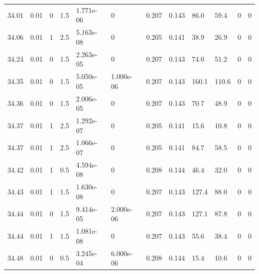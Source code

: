 \documentclass[preview]{standalone}
\begin{document}
{{{{{{{{{{\begin{tabular}{L{1.2cm}C{1.2cm} C{0.3cm}C{0.5cm} C{1.4cm}C{1.4cm} C{1.4cm}C{1.4cm} C{1.6cm}C{1.6cm} C{1.6cm}C{1.6cm}}
  34.01  &  0.01  & 0     & 1.5 &  1.771e-06  & 0  &  0.207&   0.143& 86.0 & 59.4   &  0 & 0  \\ 
  34.06  &  0.01  & 1     & 2.5 &  5.163e-08  & 0  &  0.205&   0.141& 38.9 & 26.9   &  0 & 0  \\ 
  34.24  &  0.01  & 0     & 1.5 &  2.263e-05  & 0  &  0.207&   0.143& 74.0 & 51.2   &  0 & 0  \\ 
  34.35  &  0.01  & 0     & 1.5 &  5.050e-05  & 1.000e-06  &  0.207&   0.143& 160.1 & 110.6   &  0 & 0  \\ 
  34.36  &  0.01  & 0     & 1.5 &  2.006e-05  & 0  &  0.207&   0.143& 70.7 & 48.9   &  0 & 0  \\ 
  34.37  &  0.01  & 1     & 2.5 &  1.292e-07  & 0  &  0.205&   0.141& 15.6 & 10.8   &  0 & 0  \\ 
  34.37  &  0.01  & 1     & 2.5 &  1.066e-07  & 0  &  0.205&   0.141& 84.7 & 58.5   &  0 & 0  \\ 
  34.42  &  0.01  & 1     & 0.5 &  4.594e-08  & 0  &  0.208&   0.144& 46.4 & 32.0   &  0 & 0  \\ 
  34.43  &  0.01  & 1     & 1.5 &  1.630e-08  & 0  &  0.207&   0.143& 127.4 & 88.0   &  0 & 0  \\ 
  34.44  &  0.01  & 0     & 1.5 &  9.414e-05  & 2.000e-06  &  0.207&   0.143& 127.1 & 87.8   &  0 & 0  \\ 
  34.44  &  0.01  & 1     & 1.5 &  1.081e-08  & 0  &  0.207&   0.143& 55.6 & 38.4   &  0 & 0  \\ 
  34.48  &  0.01  & 0     & 0.5 &  3.245e-04  & 6.000e-06  &  0.208&   0.144& 15.4 & 10.6   &  0 & 0  \\ 
\hline 
\end{tabular} 

}}}}}}}}}}
\end{document}
